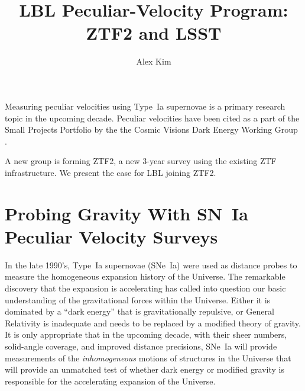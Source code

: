\documentclass[11pt, oneside]{article}   	%
\title{LBL Peculiar-Velocity Program: ZTF2 and LSST}
\author{Alex Kim}
\begin{document}
\maketitle


Measuring peculiar velocities using Type~Ia supernovae is a primary research topic in the upcoming decade.  Peculiar velocities have
been cited as a part of the   Small Projects Portfolio  by the the Cosmic Visions Dark Energy Working Group \cite{2018arXiv180207216D}.

A new group is forming ZTF2, a new 3-year survey using the existing ZTF infrastructure.  We present the case for LBL joining ZTF2.

\section{Probing Gravity With SN~Ia  Peculiar Velocity Surveys}
In the late 1990's, Type~Ia supernovae (SNe~Ia) were used as distance probes to measure the homogeneous expansion history of the Universe.  The remarkable discovery
that the expansion is accelerating  has called into question our basic understanding of the gravitational forces within the Universe.  Either it
is dominated by a ``dark energy'' that is gravitationally repulsive, or General Relativity is inadequate and needs to be replaced by a modified theory of
gravity.  It is only appropriate that in the upcoming decade, with their sheer numbers, solid-angle coverage,
and improved distance precisions, SNe~Ia will provide measurements of the {\it inhomogeneous} motions of structures in the Universe
that will provide an unmatched test of whether dark energy or modified gravity is responsible for the accelerating expansion of the Universe.
\end{document}
